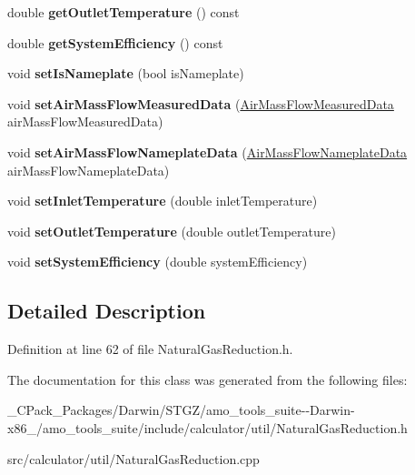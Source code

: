 \begin{DoxyCompactItemize}
double {\bfseries get\+Outlet\+Temperature} () const
\item 
\mbox{\label{class_air_mass_flow_data_ad01e82b308d2153eaef3818430c18c6a}} 
double {\bfseries get\+System\+Efficiency} () const
\item 
\mbox{\label{class_air_mass_flow_data_a8093e119b1bf0c0dc082574660b56ab3}} 
void {\bfseries set\+Is\+Nameplate} (bool is\+Nameplate)
\item 
\mbox{\label{class_air_mass_flow_data_af4d68a24b3f250549a0b33bda04b0cf4}} 
void {\bfseries set\+Air\+Mass\+Flow\+Measured\+Data} (\hyperlink{class_air_mass_flow_measured_data}{Air\+Mass\+Flow\+Measured\+Data} air\+Mass\+Flow\+Measured\+Data)
\item 
\mbox{\label{class_air_mass_flow_data_adad30e62e8d6536620ad6c57ae1fd28d}} 
void {\bfseries set\+Air\+Mass\+Flow\+Nameplate\+Data} (\hyperlink{class_air_mass_flow_nameplate_data}{Air\+Mass\+Flow\+Nameplate\+Data} air\+Mass\+Flow\+Nameplate\+Data)
\item 
\mbox{\label{class_air_mass_flow_data_acb11c2d502c8b08615f828202fea881c}} 
void {\bfseries set\+Inlet\+Temperature} (double inlet\+Temperature)
\item 
\mbox{\label{class_air_mass_flow_data_a76eabf5b08a0cf32747cb80de0f7e8a0}} 
void {\bfseries set\+Outlet\+Temperature} (double outlet\+Temperature)
\item 
\mbox{\label{class_air_mass_flow_data_ae8f2a45f436a28301373c50e80826796}} 
void {\bfseries set\+System\+Efficiency} (double system\+Efficiency)
\end{DoxyCompactItemize}


\subsection{Detailed Description}


Definition at line 62 of file Natural\+Gas\+Reduction.\+h.



The documentation for this class was generated from the following files\+:\begin{DoxyCompactItemize}
\item 
\+\_\+\+C\+Pack\+\_\+\+Packages/\+Darwin/\+S\+T\+G\+Z/amo\+\_\+tools\+\_\+suite-\/-\/\+Darwin-\/x86\+\_/amo\+\_\+tools\+\_\+suite/include/calculator/util/Natural\+Gas\+Reduction.\+h\item 
src/calculator/util/Natural\+Gas\+Reduction.\+cpp\end{DoxyCompactItemize}
